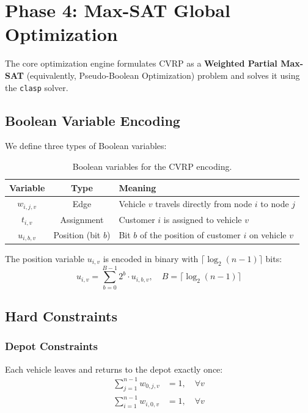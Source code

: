 \documentclass[12pt,a4paper]{article}
\theoremstyle{definition}
\begin{document}
\section{Phase 4: Max-SAT Global Optimization}

The core optimization engine formulates CVRP as a \textbf{Weighted Partial Max-SAT} (equivalently, Pseudo-Boolean Optimization) problem and solves it using the \texttt{clasp} solver.

\subsection{Boolean Variable Encoding}

We define three types of Boolean variables:

\begin{table}[H]
\centering
\begin{tabular}{ccl}
\toprule
\textbf{Variable} & \textbf{Type} & \textbf{Meaning} \\
\midrule
$w_{i,j,v}$ & Edge & Vehicle $v$ travels directly from node $i$ to node $j$ \\
$t_{i,v}$ & Assignment & Customer $i$ is assigned to vehicle $v$ \\
$u_{i,b,v}$ & Position (bit $b$) & Bit $b$ of the position of customer $i$ on vehicle $v$ \\
\bottomrule
\end{tabular}
\caption{Boolean variables for the CVRP encoding.}
\end{table}

The position variable $u_{i,v}$ is encoded in binary with $\lceil \log_2(n-1) \rceil$ bits:
\begin{equation}
u_{i,v} = \sum_{b=0}^{B-1} 2^b \cdot u_{i,b,v}, \quad B = \lceil \log_2(n-1) \rceil
\end{equation}

\subsection{Hard Constraints}

\subsubsection{Depot Constraints}

Each vehicle leaves and returns to the depot exactly once:
\begin{align}
\sum_{j=1}^{n-1} w_{0,j,v} &= 1, \quad \forall v \tag{C1} \\
\sum_{i=1}^{n-1} w_{i,0,v} &= 1, \quad \forall v \tag{C2}
\end{align}
\end{document}
